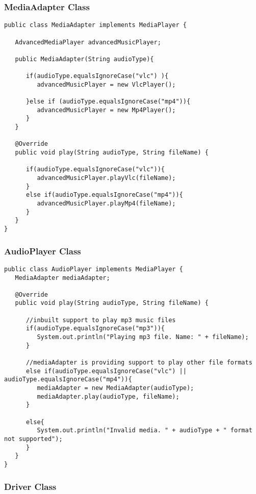 \subsubsection{MediaAdapter Class}

\begin{verbatim}
public class MediaAdapter implements MediaPlayer {

   AdvancedMediaPlayer advancedMusicPlayer;

   public MediaAdapter(String audioType){
   
      if(audioType.equalsIgnoreCase("vlc") ){
         advancedMusicPlayer = new VlcPlayer();			
         
      }else if (audioType.equalsIgnoreCase("mp4")){
         advancedMusicPlayer = new Mp4Player();
      }	
   }

   @Override
   public void play(String audioType, String fileName) {
   
      if(audioType.equalsIgnoreCase("vlc")){
         advancedMusicPlayer.playVlc(fileName);
      }
      else if(audioType.equalsIgnoreCase("mp4")){
         advancedMusicPlayer.playMp4(fileName);
      }
   }
}
\end{verbatim}

\subsubsection{AudioPlayer Class}

\begin{verbatim}
public class AudioPlayer implements MediaPlayer {
   MediaAdapter mediaAdapter; 

   @Override
   public void play(String audioType, String fileName) {		

      //inbuilt support to play mp3 music files
      if(audioType.equalsIgnoreCase("mp3")){
         System.out.println("Playing mp3 file. Name: " + fileName);			
      } 
      
      //mediaAdapter is providing support to play other file formats
      else if(audioType.equalsIgnoreCase("vlc") || audioType.equalsIgnoreCase("mp4")){
         mediaAdapter = new MediaAdapter(audioType);
         mediaAdapter.play(audioType, fileName);
      }
      
      else{
         System.out.println("Invalid media. " + audioType + " format not supported");
      }
   }   
}
\end{verbatim}

\subsubsection{Driver Class}

